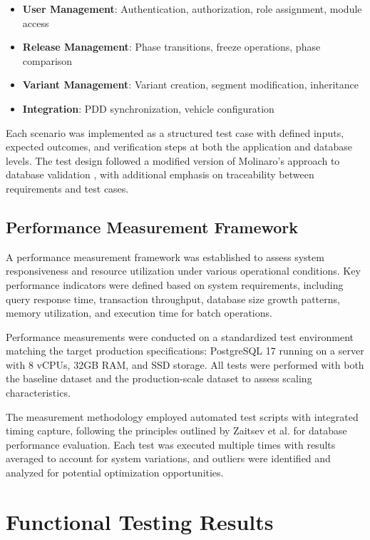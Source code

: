 \begin{itemize}
\item \textbf{User Management}: Authentication, authorization, role assignment, module access
\item \textbf{Release Management}: Phase transitions, freeze operations, phase comparison
\item \textbf{Variant Management}: Variant creation, segment modification, inheritance
\item \textbf{Integration}: PDD synchronization, vehicle configuration
\end{itemize}

Each scenario was implemented as a structured test case with defined inputs, expected outcomes, and verification steps at both the application and database levels. The test design followed a modified version of Molinaro's approach to database validation \cite{molinaro2005sql}, with additional emphasis on traceability between requirements and test cases.

\subsection{Performance Measurement Framework}
\label{subsec:performance-measurement-framework}

A performance measurement framework was established to assess system responsiveness and resource utilization under various operational conditions. Key performance indicators were defined based on system requirements, including query response time, transaction throughput, database size growth patterns, memory utilization, and execution time for batch operations. 

Performance measurements were conducted on a standardized test environment matching the target production specifications: PostgreSQL 17 running on a server with 8 vCPUs, 32GB RAM, and SSD storage. All tests were performed with both the baseline dataset and the production-scale dataset to assess scaling characteristics.

The measurement methodology employed automated test scripts with integrated timing capture, following the principles outlined by Zaitsev et al. \cite{schwartz2012high} for database performance evaluation. Each test was executed multiple times with results averaged to account for system variations, and outliers were identified and analyzed for potential optimization opportunities.

\section{Functional Testing Results}
\label{sec:functional-testing-results}

